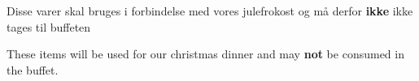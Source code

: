 \documentclass{article}
\begin{document}
\maketitle
\null

\vspace{-1cm}

\begin{center}


\vspace{-0.8cm}

\Huge
Disse varer skal bruges i forbindelse med vores julefrokost og må derfor {\color{red}\bf ikke} ikke tages til buffeten


\english


\vspace{-1.1cm}

These items will be used for our christmas dinner and may {\color{red}\bf not} be consumed in the buffet.

\end{center}

\dansk

\underskriv
\end{document}
